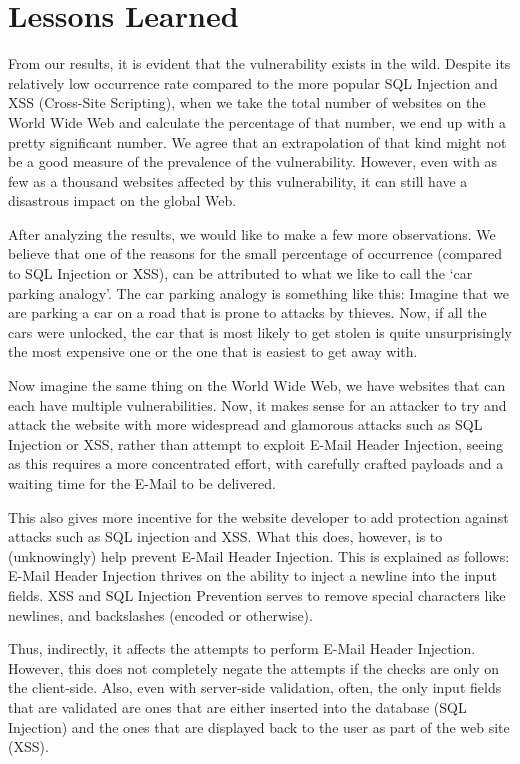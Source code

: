 \section{Lessons Learned}
    From our results, it is evident that the vulnerability exists in the wild. Despite its relatively low occurrence rate compared to the more popular SQL Injection and XSS (Cross-Site Scripting), when we take the total number of websites on the World Wide Web and calculate the percentage of that number, we end up with a pretty significant number. We agree that an extrapolation of that kind might not be a good measure of the prevalence of the vulnerability. However, even with as few as a thousand websites affected by this vulnerability, it can still have a disastrous impact on the global Web. 
    
    After analyzing the results, we would like to make a few more observations. We believe that one of the reasons for the small percentage of occurrence (compared to SQL Injection or XSS), can be attributed to what we like to call the `car parking analogy'.
    The car parking analogy is something like this: Imagine that we are parking a car on a road that is prone to attacks by thieves. Now, if all the cars were unlocked, the car that is most likely to get stolen is quite unsurprisingly the most expensive one or the one that is easiest to get away with.
    
    Now imagine the same thing on the World Wide Web, we have websites that can each have multiple vulnerabilities. Now, it makes sense for an attacker to try and attack the website with more widespread and glamorous attacks such as SQL Injection or XSS, rather than attempt to exploit E-Mail Header Injection, seeing as this requires a more concentrated effort, with carefully crafted payloads and a waiting time for the E-Mail to be delivered.
    
    This also gives more incentive for the website developer to add protection against attacks such as SQL injection and XSS. What this does, however, is to (unknowingly) help prevent E-Mail Header Injection. This is explained as follows: E-Mail Header Injection thrives on the ability to inject a newline into the input fields. XSS and SQL Injection Prevention serves to remove special characters like newlines,  and backslashes (encoded or otherwise). 
    
    Thus, indirectly, it affects the attempts to perform E-Mail Header Injection. However, this does not completely negate the attempts if the checks are only on the client-side. Also, even with server-side validation, often, the only input fields that are validated are ones that are either inserted into the database (SQL Injection) and the ones that are displayed back to the user as part of the web site (XSS).


